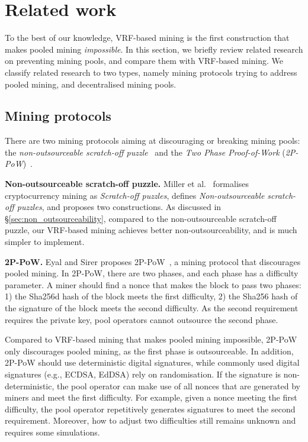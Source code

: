 \section{Related work}
\label{sec:related}

To the best of our knowledge, VRF-based mining is the first construction that makes pooled mining \textit{impossible}.
In this section, we briefly review related research on preventing mining pools, and compare them with VRF-based mining.
We classify related research to two types, namely mining protocols trying to address pooled mining, and decentralised mining pools.

\subsection{Mining protocols}

There are two mining protocols aiming at discouraging or breaking mining pools: the \textit{non-outsourceable scratch-off puzzle}~\cite{miller2015nonoutsourceable} and the \textit{Two Phase Proof-of-Work} (\textit{2P-PoW})~\cite{2P-PoW}.

\textbf{Non-outsourceable scratch-off puzzle.}
Miller et al.~\cite{miller2015nonoutsourceable} formalises cryptocurrency mining as \textit{Scratch-off puzzles}, defines \textit{Non-outsourceable scratch-off puzzles}, and proposes two constructions.
As discussed in \S\ref{sec:non_outsourceability}, compared to the non-outsourceable scratch-off puzzle, our VRF-based mining achieves better non-outsourceability, and is much simpler to implement.

\textbf{2P-PoW.}
Eyal and Sirer proposes 2P-PoW~\cite{2P-PoW}, a mining protocol that discourages pooled mining.
In 2P-PoW, there are two phases, and each phase has a difficulty parameter.
A miner should find a nonce that makes the block to pass two phases: 1) the Sha256d hash of the block meets the first difficulty, 2) the Sha256 hash of the signature of the block meets the second difficulty.
As the second requirement requires the private key, pool operators cannot outsource the second phase.

Compared to VRF-based mining that makes pooled mining impossible, 2P-PoW only discourages pooled mining, as the first phase is outsourceable.
In addition, 2P-PoW should use deterministic digital signatures, while commonly used digital signatures (e.g., ECDSA, EdDSA) rely on randomisation.
If the signature is non-deterministic, the pool operator can make use of all nonces that are generated by miners and meet the first difficulty.
For example, given a nonce meeting the first difficulty, the pool operator repetitively generates signatures to meet the second requirement.
Moreover, how to adjust two difficulties still remains unknown and requires some simulations.

